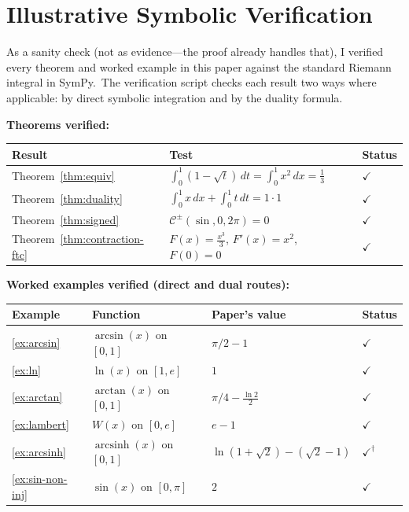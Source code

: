 \documentclass[11pt,a4paper]{article}
\begin{document}
\section{Illustrative Symbolic Verification}

As a sanity check (not as evidence---the proof already handles that), I verified every theorem and worked example in this paper against the standard Riemann integral in SymPy.\ The verification script checks each result two ways where applicable: by direct symbolic integration and by the duality formula.

\medskip
\noindent\textbf{Theorems verified:}

\begin{center}
\begin{tabular}{l l l}
\textbf{Result} & \textbf{Test} & \textbf{Status} \\
\hline
Theorem~\ref{thm:equiv} & $\int_0^1(1-\sqrt{t})\,dt = \int_0^1 x^2\,dx = \tfrac{1}{3}$ & $\checkmark$ \\[3pt]
Theorem~\ref{thm:duality} & $\int_0^1 x\,dx + \int_0^1 t\,dt = 1\cdot 1$ & $\checkmark$ \\[3pt]
Theorem~\ref{thm:signed} & $\mathcal{C}^{\pm}(\sin,0,2\pi)=0$ & $\checkmark$ \\[3pt]
Theorem~\ref{thm:contraction-ftc} & $F(x)=\tfrac{x^3}{3}$, \; $F'(x)=x^2$, \; $F(0)=0$ & $\checkmark$ \\
\end{tabular}
\end{center}

\medskip
\noindent\textbf{Worked examples verified (direct and dual routes):}

\begin{center}
\begin{tabular}{l l l l}
\textbf{Example} & \textbf{Function} & \textbf{Paper's value} & \textbf{Status} \\
\hline
\ref{ex:arcsin} & $\arcsin(x)$ on $[0,1]$ & $\pi/2-1$ & $\checkmark$ \\[2pt]
\ref{ex:ln} & $\ln(x)$ on $[1,e]$ & $1$ & $\checkmark$ \\[2pt]
\ref{ex:arctan} & $\arctan(x)$ on $[0,1]$ & $\pi/4 - \tfrac{\ln 2}{2}$ & $\checkmark$ \\[2pt]
\ref{ex:lambert} & $W(x)$ on $[0,e]$ & $e-1$ & $\checkmark$ \\[2pt]
\ref{ex:arcsinh} & $\operatorname{arcsinh}(x)$ on $[0,1]$ & $\ln(1{+}\sqrt{2})-(\sqrt{2}{-}1)$ & $\checkmark^{\dagger}$ \\[2pt]
\ref{ex:sin-non-inj} & $\sin(x)$ on $[0,\pi]$ & $2$ & $\checkmark$ \\
\end{tabular}
\end{center}
\end{document}
